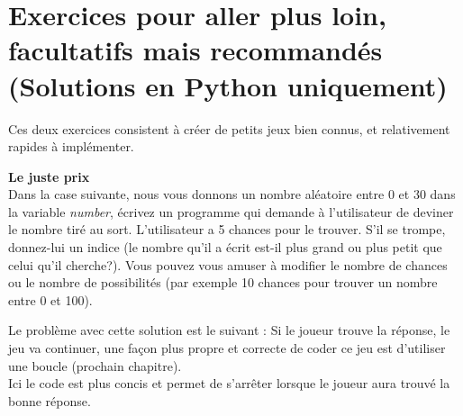\section{Exercices pour aller plus loin, facultatifs mais recommandés (Solutions en Python uniquement)} 
Ces deux exercices consistent à créer de petits jeux bien connus, et relativement rapides à implémenter. \\
\begin{Exercice}[20 minutes] \textbf{Le juste prix \optionnel}\\
  Dans la case suivante, nous vous donnons un nombre aléatoire entre 0 et 30 dans la variable \textit{number}, écrivez un programme qui demande à l'utilisateur de deviner le nombre tiré au sort. L'utilisateur a 5 chances pour le trouver. S'il se trompe, donnez-lui un indice (le nombre qu'il a écrit est-il plus grand ou plus petit que celui qu'il cherche?). Vous pouvez vous amuser à modifier le nombre de chances ou le nombre de possibilités (par exemple 10 chances pour trouver un nombre entre 0 et 100).   \\
  
  
  
  

    \begin{solution}

   
   
   Le problème avec cette solution est le suivant : Si le joueur trouve la réponse, le jeu va continuer, une façon plus propre et correcte de coder ce jeu est d'utiliser une boucle (prochain chapitre). \\
   
   
   
  	Ici le code est plus concis et permet de s'arrêter lorsque le joueur aura trouvé la bonne réponse.\\
           
    \end{solution}   
\end{Exercice}

